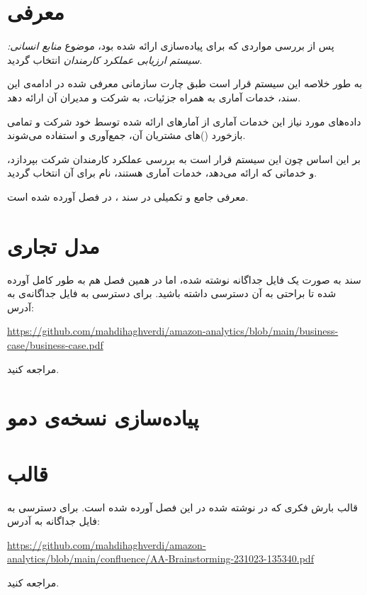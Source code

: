 \documentclass[11pt, oneside]{book}
\newcommand{\amz}{\lr{Amazon} }
\begin{document}
\frontmatter

\tableofcontents
\mainmatter

\chapter{معرفی}
    پس از بررسی مواردی که برای پیاده‌سازی ارائه شده بود، موضوع \textit{منابع انسانی:‌ سیستم ارزیابی عملکرد کارمندان} انتخاب گردید.
    
    به طور خلاصه این سیستم قرار است طبق چارت سازمانی معرفی شده در ادامه‌ی این سند، خدمات آماری به همراه جزئیات، به شرکت \amz و مدیران آن ارائه دهد. 
    
    داده‌های مورد نیاز این خدمات آماری از آمار‌های ارائه شده توسط خود شرکت \amz و تمامی بازخورد ()های مشتریان آن، جمع‌آوری و استفاده می‌شوند.
    
    بر این اساس چون این سیستم قرار است به بررسی عملکرد کارمندان شرکت \amz بپردازد، و خدماتی که ارائه می‌دهد، خدمات آماری هستند، نام  برای آن انتخاب گردید.
    
    معرفی جامع و تکمیلی در سند ، در فصل  آورده شده است.
    
\chapter{مدل تجاری }\label{business-case}
سند  به صورت یک فایل  جداگانه نوشته شده، اما در همین فصل هم به طور کامل آورده شده تا براحتی به آن دسترسی داشته باشید. برای دسترسی به فایل جداگانه‌ی  به آدرس:
\begin{flushleft}
    \url{https://github.com/mahdihaghverdi/amazon-analytics/blob/main/business-case/business-case.pdf}
\end{flushleft}
مراجعه کنید.



\chapter{پیاده‌سازی نسخه‌ی دمو}
\chapter{قالب }
قالب بارش فکری که در  نوشته شده در این فصل آورده شده است. برای دسترسی به فایل جداگانه به آدرس:
\begin{flushleft}
    \url{https://github.com/mahdihaghverdi/amazon-analytics/blob/main/confluence/AA-Brainstorming-231023-135340.pdf}
\end{flushleft}
مراجعه کنید.


\end{document}
